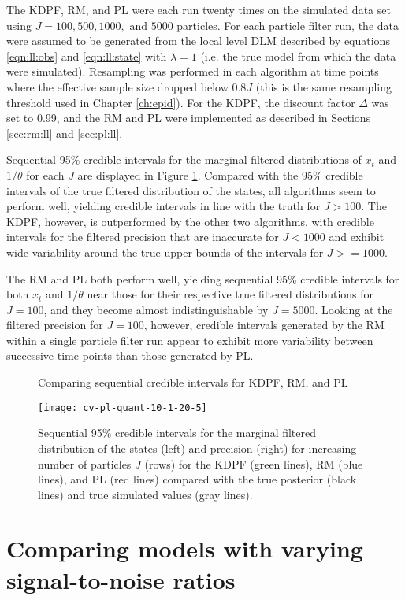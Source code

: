 The KDPF, RM, and PL were each run twenty times on the simulated data set using $J = 100, 500, 1000, \mbox{ and } 5000$ particles. For each particle filter run, the data were assumed to be generated from the local level DLM described by equations \eqref{eqn:ll:obs} and \eqref{eqn:ll:state} with $\lambda = 1$ (i.e. the true model from which the data were simulated). Resampling was performed in each algorithm at time points where the effective sample size dropped below $0.8J$ (this is the same resampling threshold used in Chapter \ref{ch:epid}). For the KDPF, the discount factor $\Delta$ was set to 0.99, and the RM and PL were implemented as described in Sections \ref{sec:rm:ll} and \ref{sec:pl:ll}.

Sequential 95\% credible intervals for the marginal filtered distributions of $x_t$ and $1/\theta$ for each $J$ are displayed in Figure \ref{fig:comp:quant}. Compared with the 95\% credible intervals of the true filtered distribution of the states, all algorithms seem to perform well, yielding credible intervals in line with the truth for $J > 100$. The KDPF, however, is outperformed by the other two algorithms, with credible intervals for the filtered precision that are inaccurate for $J < 1000$ and exhibit wide variability around the true upper bounds of the intervals for $J >= 1000$.

The RM and PL both perform well, yielding sequential 95\% credible intervals for both $x_t$ and $1/\theta$ near those for their respective true filtered distributions for $J = 100$, and they become almost indistinguishable by $J = 5000$. Looking at the filtered precision for $J = 100$, however, credible intervals generated by the RM within a single particle filter run appear to exhibit more variability between successive time points than those generated by PL.

\begin{figure}[ht]
\ssp
\centering
\caption{Comparing sequential credible intervals for KDPF, RM, and PL} \label{fig:comp:quant}
\texttt{[image: cv-pl-quant-10-1-20-5]}
\caption*{Sequential 95\% credible intervals for the marginal filtered distribution of the states (left) and precision (right) for increasing number of particles $J$ (rows) for the KDPF (green lines), RM (blue lines), and PL (red lines) compared with the true posterior (black lines) and true simulated values (gray lines).}
\end{figure}

\section{Comparing models with varying signal-to-noise ratios} \label{sec:comp:models}

